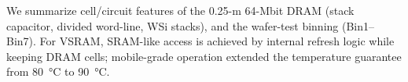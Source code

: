 We summarize cell/circuit features of the 0.25-\textmu m 64-Mbit DRAM (stack capacitor, divided word-line, WSi stacks), and the wafer-test binning (Bin1--Bin7). For VSRAM, SRAM-like access is achieved by internal refresh logic while keeping DRAM cells; mobile-grade operation extended the temperature guarantee from 80~\si{\celsius} to 90~\si{\celsius}.
